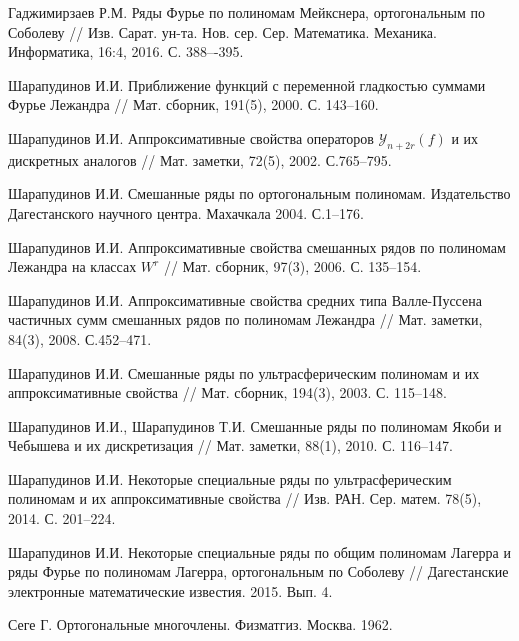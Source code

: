 \begin{thebibliography}{111}
 {Гаджимирзаев Р.М.} Ряды Фурье по полиномам Мейкснера, ортогональным по Соболеву // Изв. Сарат. ун-та. Нов. сер. Сер. Математика. Механика. Информатика, 16:4, 2016. С. 388–-395.

















{Шарапудинов И.И.} Приближение функций с переменной гладкостью суммами Фурье Лежандра // Мат. сборник,
191(5), 2000. С. 143--160.


{Шарапудинов И.И.} Аппроксимативные свойства операторов $\mathcal{ Y}_{n+2r}(f)$ и их дискретных аналогов // Мат. заметки, 72(5), 2002. С.765--795.


{Шарапудинов И.И.} Смешанные ряды по ортогональным полиномам. Издательство Дагестанского научного центра.
Махачкала 2004. С.1--176.


{Шарапудинов И.И.}
Аппроксимативные свойства смешанных рядов по полиномам Лежандра на классах $W^r$ //
Мат. сборник, 97(3), 2006. С. 135--154.


{Шарапудинов И.И.}
Аппроксимативные свойства средних типа Валле-Пуссена частичных сумм смешанных рядов по полиномам Лежандра // Мат. заметки, 84(3), 2008. С.452--471.


{Шарапудинов И.И.}
 Смешанные ряды по ультрасферическим полиномам и их аппроксимативные свойства
// Мат. сборник, 194(3), 2003. С. 115--148.


{Шарапудинов И.И., Шарапудинов Т.И.}
 Смешанные ряды по полиномам Якоби и Чебышева и их дискретизация
// Мат. заметки, 88(1), 2010. С. 116--147.


{Шарапудинов И.И.}
 Некоторые специальные ряды по ультрасферическим полиномам и их аппроксимативные свойства
// Изв. РАН. Сер. матем. 78(5), 2014. С. 201--224.


{Шарапудинов И.И.}
 Некоторые специальные ряды по общим полиномам Лагерра и ряды Фурье по полиномам Лагерра, ортогональным по Соболеву
// Дагестанские электронные математические известия. 2015. Вып. 4.


{Сеге Г.} Ортогональные многочлены. Физматгиз. Москва. 1962.



\end{thebibliography}

